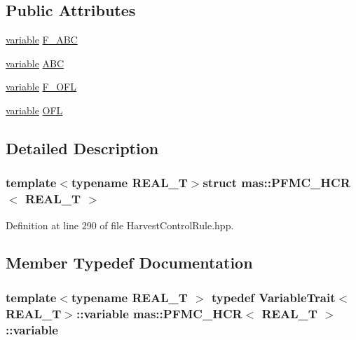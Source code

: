 \subsection*{Public Attributes}
\begin{DoxyCompactItemize}
\item 
\hyperlink{structmas_1_1_p_f_m_c___h_c_r_a1fd22811f88e2214903cfbf887f68aaf}{variable} \hyperlink{structmas_1_1_p_f_m_c___h_c_r_a9ef690cc5957f768d4ac4924bde499df}{F\-\_\-\-A\-B\-C}
\item 
\hyperlink{structmas_1_1_p_f_m_c___h_c_r_a1fd22811f88e2214903cfbf887f68aaf}{variable} \hyperlink{structmas_1_1_p_f_m_c___h_c_r_aeb488a01a83c2ad95756e8904ce5d76b}{A\-B\-C}
\item 
\hyperlink{structmas_1_1_p_f_m_c___h_c_r_a1fd22811f88e2214903cfbf887f68aaf}{variable} \hyperlink{structmas_1_1_p_f_m_c___h_c_r_a5804d2123da3f0ec617ad3f559920c9f}{F\-\_\-\-O\-F\-L}
\item 
\hyperlink{structmas_1_1_p_f_m_c___h_c_r_a1fd22811f88e2214903cfbf887f68aaf}{variable} \hyperlink{structmas_1_1_p_f_m_c___h_c_r_a5f4d1fefb9913ab7baa38590c80efa83}{O\-F\-L}
\end{DoxyCompactItemize}


\subsection{Detailed Description}
\subsubsection*{template$<$typename R\-E\-A\-L\-\_\-\-T$>$struct mas\-::\-P\-F\-M\-C\-\_\-\-H\-C\-R$<$ R\-E\-A\-L\-\_\-\-T $>$}



Definition at line 290 of file Harvest\-Control\-Rule.\-hpp.



\subsection{Member Typedef Documentation}
\hypertarget{structmas_1_1_p_f_m_c___h_c_r_a1fd22811f88e2214903cfbf887f68aaf}{
\subsubsection[{variable}]{\setlength{\rightskip}{0pt plus 5cm}template$<$typename R\-E\-A\-L\-\_\-\-T $>$ typedef {\bf Variable\-Trait}$<$R\-E\-A\-L\-\_\-\-T$>$\-::{\bf variable} {\bf mas\-::\-P\-F\-M\-C\-\_\-\-H\-C\-R}$<$ R\-E\-A\-L\-\_\-\-T $>$\-::{\bf variable}}}\label{structmas_1_1_p_f_m_c___h_c_r_a1fd22811f88e2214903cfbf887f68aaf}


